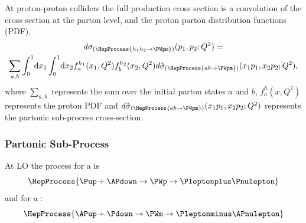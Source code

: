 At proton-proton colliders the full \PW production cross section is a
convolution of the cross-section at the parton level, and the proton parton
distribution functions (PDF),
\begin{multline}
  d\sigma_{(\HepProcess{h_1 h_2 \to \PWpm})}(p_1,p_2;Q^{2}) = \\
  \sum\limits_{a,b}
  \int_0^1 \! \mathrm{d} x_1 
  \int_0^1 \! \mathrm{d} x_2 
  f_a^{h_1}(x_1,Q^2)
  f_b^{h_2}(x_2,Q^2) 
  d\hat{\sigma}_{(\HepProcess{a b \to \PWpm})}(x_1 p_1, x_2 p_2; Q^2),
  \label{wbos:xsec}
\end{multline}
where $\sum\limits_{a,b}$ represents the sum over the initial parton states $a$
and $b$, $f_a^{h}(x,Q^2)$ represents the proton {PDF} and
$d\hat{\sigma}_{(\HepProcess{a b \to \PWpm})}(x_1 p_1, x_2 p_2; Q^2)$
represents the partonic sub-process cross-section.

\subsubsection*{Partonic Sub-Process}

At {LO} the process for a \PWp is
\begin{equation}
  \HepProcess{\Pup + \APdown \to \PWp \to \Pleptonplus \Pnulepton} 
  \label{wbos:wpprod} 
\end{equation}
and for a \PWm:
\begin{equation}
  \HepProcess{\APup + \Pdown \to \PWm \to \Pleptonminus \APnulepton}
  \label{wbos:wmprod} 
\end{equation}

